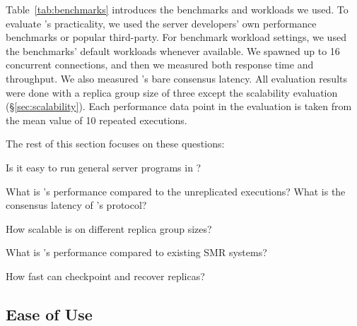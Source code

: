 Table~\ref{tab:benchmarks} introduces the benchmarks and workloads we used. To 
evaluate \xxx's practicality, we used the server developers' own performance 
benchmarks or popular third-party. For benchmark workload settings, we used the 
benchmarks' default workloads whenever available. We spawned up to 16 
concurrent connections, and then we measured both response time and 
throughput. We also measured \xxx's bare consensus latency. All evaluation 
results were done with a replica group size of three except the scalability 
evaluation (\S\ref{sec:scalability}). Each performance data point in the 
evaluation is taken from the mean value of 10 repeated executions.

The rest of this section focuses on these questions:

\begin{tightenum}

\item[\S\ref{sec:ease-of-use}:] Is it easy to run general server programs 
in \xxx?

\item[\S\ref{sec:overhead}:] What is \xxx's performance compared to the 
unreplicated executions? What is the consensus latency of \xxx's \paxos 
protocol?

\item[\S\ref{sec:scalability}:] How scalable is \xxx on different replica group 
sizes?

\item[\S\ref{sec:compare}:] What is \xxx's performance compared to existing 
SMR systems?

\item[\S\ref{sec:robust}:] How fast can \xxx checkpoint and recover replicas?



\end{tightenum}


\subsection{Ease of Use} \label{sec:ease-of-use}

